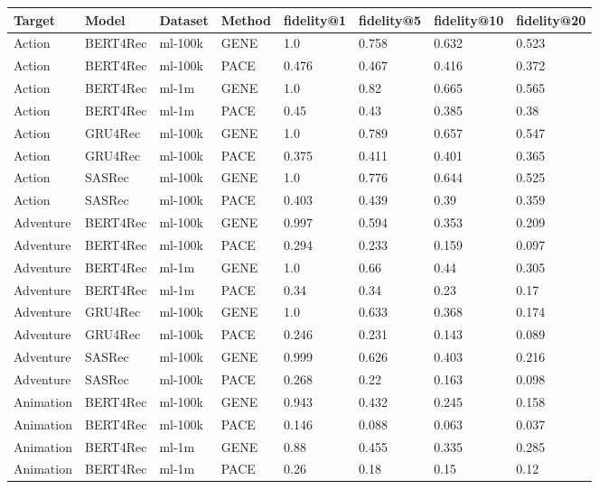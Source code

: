\begingroup
    \setlength{\tabcolsep}{6pt} %
    \renewcommand{\arraystretch}{1.2} %
    \small %
    \begin{longtable}{|l|l|l|l|l|l|l|l|}
    \hline
\textbf{Target} & \textbf{Model} & \textbf{Dataset} & \textbf{Method} & \textbf{fidelity@1} & \textbf{fidelity@5} & \textbf{fidelity@10} & \textbf{fidelity@20} \\ \hline
\endhead
Action & BERT4Rec & ml-100k & GENE & 1.0 & 0.758 & 0.632 & 0.523 \\
Action & BERT4Rec & ml-100k & PACE & 0.476 & 0.467 & 0.416 & 0.372 \\\hline
Action & BERT4Rec & ml-1m & GENE & 1.0 & 0.82 & 0.665 & 0.565 \\
Action & BERT4Rec & ml-1m & PACE & 0.45 & 0.43 & 0.385 & 0.38 \\\hline
Action & GRU4Rec & ml-100k & GENE & 1.0 & 0.789 & 0.657 & 0.547 \\
Action & GRU4Rec & ml-100k & PACE & 0.375 & 0.411 & 0.401 & 0.365 \\\hline
Action & SASRec & ml-100k & GENE & 1.0 & 0.776 & 0.644 & 0.525 \\
Action & SASRec & ml-100k & PACE & 0.403 & 0.439 & 0.39 & 0.359 \\\hline
Adventure & BERT4Rec & ml-100k & GENE & 0.997 & 0.594 & 0.353 & 0.209 \\
Adventure & BERT4Rec & ml-100k & PACE & 0.294 & 0.233 & 0.159 & 0.097 \\\hline
Adventure & BERT4Rec & ml-1m & GENE & 1.0 & 0.66 & 0.44 & 0.305 \\
Adventure & BERT4Rec & ml-1m & PACE & 0.34 & 0.34 & 0.23 & 0.17 \\\hline
Adventure & GRU4Rec & ml-100k & GENE & 1.0 & 0.633 & 0.368 & 0.174 \\
Adventure & GRU4Rec & ml-100k & PACE & 0.246 & 0.231 & 0.143 & 0.089 \\\hline
Adventure & SASRec & ml-100k & GENE & 0.999 & 0.626 & 0.403 & 0.216 \\
Adventure & SASRec & ml-100k & PACE & 0.268 & 0.22 & 0.163 & 0.098 \\\hline
Animation & BERT4Rec & ml-100k & GENE & 0.943 & 0.432 & 0.245 & 0.158 \\
Animation & BERT4Rec & ml-100k & PACE & 0.146 & 0.088 & 0.063 & 0.037 \\\hline
Animation & BERT4Rec & ml-1m & GENE & 0.88 & 0.455 & 0.335 & 0.285 \\
Animation & BERT4Rec & ml-1m & PACE & 0.26 & 0.18 & 0.15 & 0.12 \\\hline

\end{longtable}
